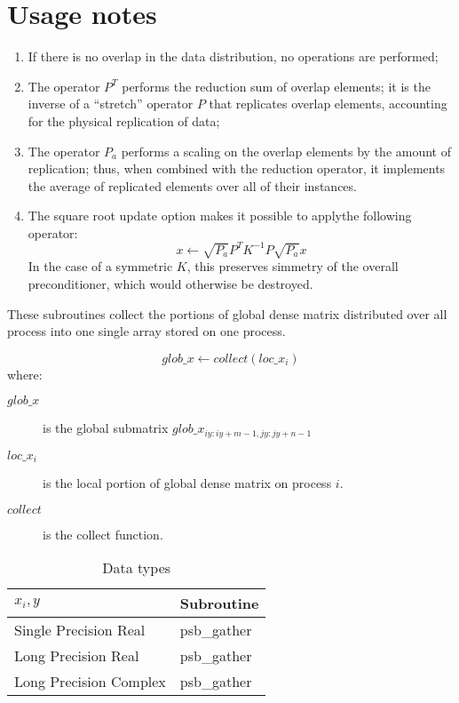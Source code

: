 \section*{Usage notes}
\begin{enumerate}
\item If there is no overlap in the data distribution, no operations
are performed;
\item The operator $P^{T}$ performs the reduction sum of overlap
elements; it is the inverse of a ``stretch'' operator $P$ that
replicates overlap elements, accounting for the physical replication
of data;
\item The operator $P_a$ performs a scaling on the overlap elements by
the amount of replication; thus, when combined with the reduction
operator, it implements the average of replicated elements over all of
their instances. 
\item The square root update option makes it possible to applythe
following operator: 
\[ x\leftarrow \sqrt{P_a} P^{T} K^{-1} P \sqrt{P_a} x\]
In the case of a symmetric $K$, this preserves simmetry of the overall
preconditioner, which would otherwise be destroyed. 
\end{enumerate}


%
%


These subroutines collect the portions of global dense matrix
distributed over all process into one single array stored on one
process.

\[ glob\_x \leftarrow collect(loc\_x_i) \]
where:
\begin{description}
\item[$glob\_x$] is the global submatrix $glob\_x_{iy:iy+m-1,jy:jy+n-1}$
\item[$loc\_x_i$] is the local portion of global dense matrix on
process $i$.
\item[$collect$] is the collect function.
\end{description}

\begin{table}[h]
\begin{center}
\begin{tabular}{ll}
\hline
$x_i, y$ & {\bf Subroutine}\\
\hline
Single Precision Real & psb\_gather\\
Long Precision Real & psb\_gather \\
Long Precision Complex & psb\_gather \\
\hline
\end{tabular}
\end{center}
\caption{Data types\label{tab:gather}}
\end{table}


